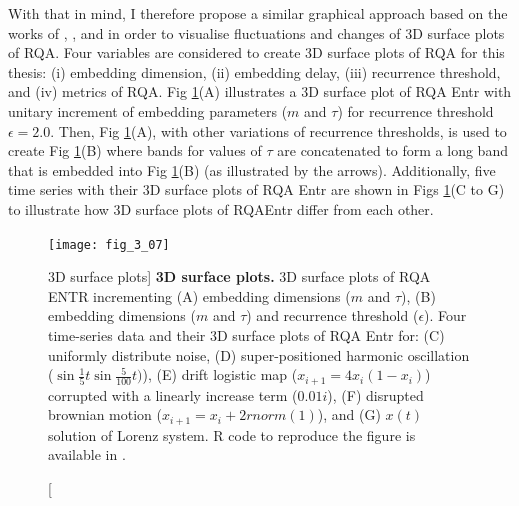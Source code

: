 With that in mind, I therefore propose a similar graphical approach 
based on the works of \cite{zbilut1992}, \cite{webber2018}, 
and \cite{marwan2015} in order to visualise fluctuations 
and changes of 3D surface plots of RQA.
Four variables are considered to create 3D surface 
plots of RQA for this thesis: 
(i) embedding dimension,
(ii) embedding delay,
(iii) recurrence threshold, and 
(iv) metrics of RQA. 
Fig \ref{fig:fig_37}(A) illustrates a 3D surface plot of RQA Entr  
with unitary increment of embedding parameters ($m$ and $\tau$)
for recurrence threshold $\epsilon=2.0$.
Then, Fig \ref{fig:fig_37}(A), with other variations of recurrence thresholds, 
is used to create Fig \ref{fig:fig_37}(B) where bands 
for values of $\tau$ are concatenated to form a long band
that is embedded into Fig \ref{fig:fig_37}(B) 
(as illustrated by the arrows).
Additionally, five time series with their 3D surface plots of 
RQA Entr are shown in Figs \ref{fig:fig_37}(C to G)
to illustrate how 3D surface plots of RQAEntr differ from each other.
\begin{figure}
  \centering
    \texttt{[image: fig\_3\_07]}
    \caption
	[3D surface plots]{
	{\bf 3D surface plots.} 
	3D surface plots of RQA ENTR incrementing 
	(A) embedding dimensions ($m$ and $\tau$),
	(B) embedding dimensions ($m$ and $\tau$) and
	recurrence threshold ($\epsilon$).
	Four time-series data and their 3D surface plots of 
	RQA Entr for:
	(C) uniformly distribute noise,
	(D) super-positioned harmonic oscillation 
	($\sin{ \frac{1}{5} t} \sin{ \frac{5}{100}t) }$),
	(E) drift logistic map ($x_{i+1} = 4 x_i (1- x_i) $) corrupted 
	with a linearly increase term ($0.01 i$),
	(F) disrupted brownian motion  ($x_{i+1} = x_i + 2rnorm(1) $), and
	(G) $x(t)$ solution of Lorenz system.
	R code to reproduce the figure is available in \cite{xochicale2018}.
	}
    \label{fig:fig_37}
\end{figure}

